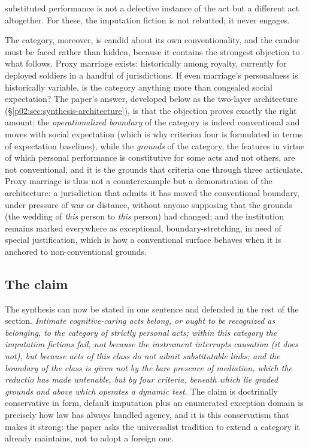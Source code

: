 \documentclass[11pt,a4paper]{article}
\begin{document}
substituted performance is not a defective instance of the act but a different act altogether. For these, the imputation fiction is not rebutted; it never engages.

The category, moreover, is candid about its own conventionality, and the candor must be faced rather than hidden, because it contains the strongest objection to what follows. Proxy marriage exists: historically among royalty, currently for deployed soldiers in a handful of jurisdictions. If even marriage's personalness is historically variable, is the category anything more than congealed social expectation? The paper's answer, developed below as the two-layer architecture (\S\ref{p02:sec:synthesis-architecture}), is that the objection proves exactly the right amount: the \emph{operationalized boundary} of the category is indeed conventional and moves with social expectation (which is why criterion four is formulated in terms of expectation baselines), while the \emph{grounds} of the category, the features in virtue of which personal performance is constitutive for some acts and not others, are not conventional, and it is the grounds that criteria one through three articulate. Proxy marriage is thus not a counterexample but a demonstration of the architecture: a jurisdiction that admits it has moved the conventional boundary, under pressure of war or distance, without anyone supposing that the grounds (the wedding of \emph{this} person to \emph{this} person) had changed; and the institution remains marked everywhere as exceptional, boundary-stretching, in need of special justification, which is how a conventional surface behaves when it is anchored to non-conventional grounds.

\subsection{The claim}
\label{p02:sec:synthesis-claim}

The synthesis can now be stated in one sentence and defended in the rest of the section. \emph{Intimate cognitive-caring acts belong, or ought to be recognized as belonging, to the category of strictly personal acts; within this category the imputation fictions fail, not because the instrument interrupts causation (it does not), but because acts of this class do not admit substitutable links; and the boundary of the class is given not by the bare presence of mediation, which the reductio has made untenable, but by four criteria, beneath which lie graded grounds and above which operates a dynamic test.} The claim is doctrinally conservative in form, default imputation plus an enumerated exception domain is precisely how law has always handled agency, and it is this conservatism that makes it strong: the paper asks the universalist tradition to extend a category it already maintains, not to adopt a foreign one.
\end{document}
